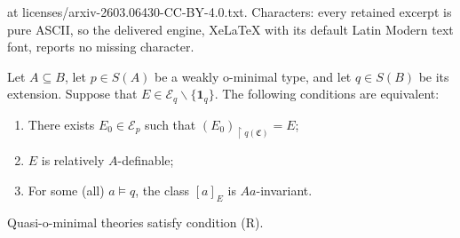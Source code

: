 \documentclass[10pt,a4paper]{amsart}
\def\strok{\restriction}
\newcommand{\Mon}{\mathfrak C}
\begin{document}
at licenses/arxiv-2603.06430-CC-BY-4.0.txt. Characters: every retained excerpt is pure ASCII, so the delivered engine, XeLaTeX with its default Latin Modern text font, reports no missing character.
\begin{Lemma}\label{Lemma O EKVIVALENCIJAMA}
Let $A\subseteq B$, let $p\in S(A)$ be a weakly o-minimal type, and let $q\in S(B)$ be its extension. Suppose that $E\in\mathcal E_q\smallsetminus\{\mathbf 1_q\}$. The following conditions are equivalent:
\begin{enumerate}[\hspace{10pt}1)]
\item There exists $E_0\in\mathcal E_p$ such that $(E_{0})_{\strok q(\Mon)}= E$;
\item $E$ is relatively $A$-definable;
\item For some (all) $a\models q$, the class $[a]_E$ is $Aa$-invariant.
\end{enumerate}
\end{Lemma}

\begin{Proposition}\label{Prop_quasio_satisfy_R} 
Quasi-o-minimal theories satisfy condition (R).
\end{Proposition}
\end{document}
